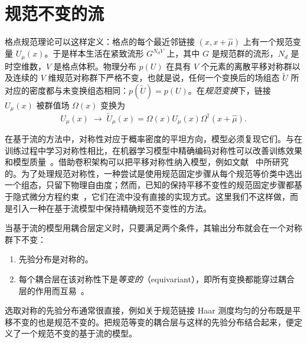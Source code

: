 \section{规范不变的流}
格点规范理论可以这样定义：格点的每个最近邻链接 $(x,x+\hat{\mu})$ 上有一个规范变量 $U_\mu(x)$。于是样本生活在紧致流形 $G^{N_d V}$ 上，其中 $G$ 是规范群的流形，$N_d$ 是时空维数，$V$ 是格点体积。物理分布 $p(U)$ 在具有 $V$ 个元素的离散平移对称群以及连续的 $V$ 维规范对称群下严格不变，也就是说，任何一个变换后的场组态 $\widetilde{U}$ 所对应的密度都与未变换组态相同：$p(\widetilde{U}) = p(U)$。在\emph{规范变换}下，链接 $U_\mu(x)$ 被群值场 $\Omega(x)$ 变换为
%
\begin{equation} \label{eqn:gauge-transform}
  U_{\mu}(x) \; \rightarrow \; \widetilde{U}_\mu(x) = \Omega(x) U_{\mu}(x) \Omega^\dagger (x+\hat{\mu}).
\end{equation}
%

在基于流的方法中，对称性对应于概率密度的平坦方向，模型必须复现它们。与在训练过程中学习对称性相比，在机器学习模型中精确编码对称性可以改善训练效果和模型质量~\cite{CohenWelling2016,Cohen:2019,khler2019equivariant,rezende2019equivariant,wirnsberger2020targeted, ZhangEWang2018Monge,Finzi:2020}。借助卷积架构可以把平移对称性纳入模型，例如文献~\cite{CohenWelling2016} 中所研究的。为了处理规范对称性，一种尝试是使用规范固定步骤从每个规范等价类中选出一个组态，只留下物理自由度；然而，已知的保持平移不变性的规范固定步骤都基于隐式微分方程约束~\cite{DeGrand:2006zz}，它们在流中没有直接的实现方式。这里我们不这样做，而是引入一种在基于流模型中保持精确规范不变性的方法。

当基于流的模型用耦合层定义时，只要满足两个条件，其输出分布就会在一个对称群下不变：
%
\begin{enumerate}
    \item 先验分布是对称的。
    \item 每个耦合层在该对称性下是\emph{等变的}（equivariant），即所有变换都能穿过耦合层的作用而互易~\cite{Hinton:2011,kivinen2011transformation,schmidt2012learning,CohenWelling2016,rezende2019equivariant}。
\end{enumerate}
%
选取对称的先验分布通常很直接，例如关于规范链接 Haar 测度均匀的分布既是平移不变的也是规范不变的。把规范等变的耦合层与这样的先验分布结合起来，便定义了一个规范不变的基于流的模型。
